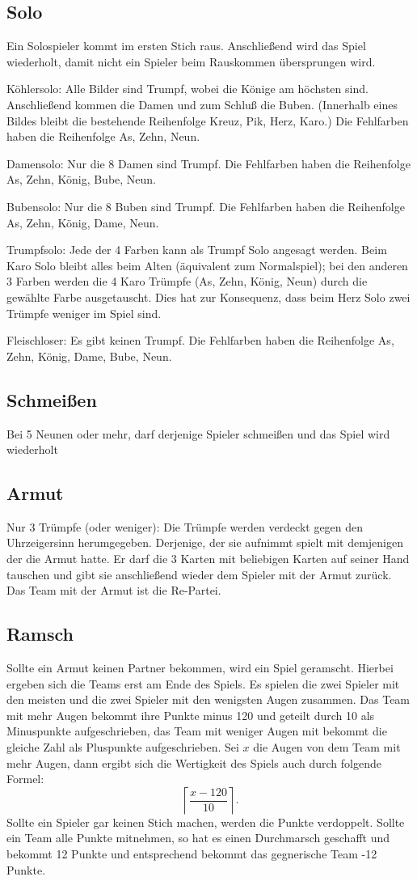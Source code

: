 \documentclass[a4paper,11pt]{article}
\begin{document}
\subsection{Solo}
Ein Solospieler kommt im ersten Stich raus. Anschließend wird das Spiel wiederholt, damit nicht ein Spieler beim Rauskommen übersprungen wird.
\begin{description}
\item{Köhlersolo:} Alle Bilder sind Trumpf, wobei die Könige am höchsten sind. Anschließend kommen die Damen und zum Schluß die Buben. (Innerhalb eines Bildes bleibt die bestehende Reihenfolge Kreuz, Pik, Herz, Karo.) Die Fehlfarben haben die Reihenfolge As, Zehn, Neun.
\item{Damensolo:} Nur die 8 Damen sind Trumpf. Die Fehlfarben haben die Reihenfolge As, Zehn, König, Bube, Neun.
\item{Bubensolo:} Nur die 8 Buben sind Trumpf. Die Fehlfarben haben die Reihenfolge As, Zehn, König, Dame, Neun.
\item{Trumpfsolo:} Jede der 4 Farben kann als Trumpf Solo angesagt werden. Beim Karo Solo bleibt alles beim Alten (äquivalent zum Normalspiel); bei den anderen 3 Farben werden die 4 Karo Trümpfe (As, Zehn, König, Neun) durch die gewählte Farbe ausgetauscht. Dies hat zur Konsequenz, dass beim Herz Solo zwei Trümpfe weniger im Spiel sind.
\item{Fleischloser:} Es gibt keinen Trumpf. Die Fehlfarben haben die Reihenfolge As, Zehn, König, Dame, Bube, Neun.
\end{description} 
\subsection{Schmeißen}
Bei 5 Neunen oder mehr, darf derjenige Spieler schmeißen und das Spiel wird wiederholt
\subsection{Armut}Nur 3 Trümpfe (oder weniger): Die Trümpfe werden verdeckt gegen den Uhrzeigersinn herumgegeben. Derjenige, der sie aufnimmt spielt mit demjenigen der die Armut hatte. Er darf die 3 Karten mit beliebigen Karten auf seiner Hand tauschen und gibt sie anschließend wieder dem Spieler mit der Armut zurück. Das Team mit der Armut ist die Re-Partei.
\subsection{Ramsch}\label{Ramsch}
Sollte ein Armut keinen Partner bekommen, wird ein Spiel geramscht. Hierbei ergeben sich die Teams erst am Ende des Spiels. Es spielen die zwei Spieler mit den meisten und die zwei Spieler mit den wenigsten Augen zusammen. Das Team mit mehr Augen bekommt ihre Punkte minus 120 und geteilt  durch 10 als Minuspunkte aufgeschrieben, das Team mit weniger Augen mit bekommt die gleiche Zahl als Pluspunkte aufgeschrieben. Sei $x$ die Augen von dem Team mit mehr Augen, dann ergibt sich die Wertigkeit des Spiels auch durch folgende Formel:
\[\left\lceil\frac{ x-120}{10} \right\rceil.\]
Sollte ein Spieler gar keinen Stich machen, werden die Punkte verdoppelt.
Sollte ein Team alle Punkte mitnehmen, so hat es einen Durchmarsch geschafft und bekommt 12 Punkte und entsprechend bekommt das gegnerische Team -12 Punkte.
\end{document}
